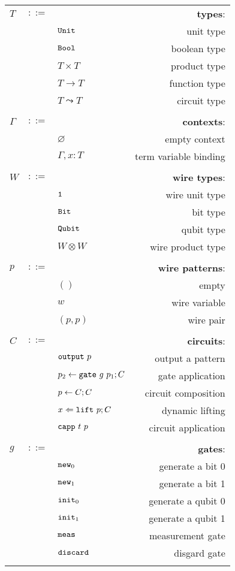 \documentclass[12pt]{article}
\begin{document}
\begin{longtable}[c]{lclr}
  $T$ &$::=$ &  &\textbf{types}: \\
      & &$\mathtt{Unit}$ &unit type\\
      & &$\mathtt{Bool}$ &boolean type \\
      & &$T\times T$ &product type\\
      & &$T\to T$ &function type\\
      & &$T\leadsto T$ &circuit type\\
  \\

  $\Gamma$ &$::=$ &  &\textbf{contexts}: \\
      & &$\varnothing$ &empty context\\
      & &$\Gamma,x:T$ &term variable binding\\
  \\


  $W$ &$::=$ &  &\textbf{wire types}: \\
      & &$\mathtt{1}$ &wire unit type\\
      & &$\mathtt{Bit}$ &bit type \\
      & &$\mathtt{Qubit}$ &qubit type \\
      & &$W \otimes W$ &wire product type \\
  \\

  $p$ &$::=$ &  &\textbf{wire patterns}: \\
      & &$()$ &empty\\
      & &$w$ &wire variable \\
      & &$(p,p)$ &wire pair \\
  \\

  $C$ &$::=$ &  &\textbf{circuits}: \\
      & &$\toutput\ p$ &output a pattern \\
      & &$p_2 \leftarrow \mathtt{gate}\ g\ p_1 ; C$ &gate application \\
      & &$p \leftarrow C ; C$ &circuit composition \\
      & &$x \From \lift\ p ; C$ &dynamic lifting \\
      & &$\capp\ t\ p$ &circuit application \\
  \\

  $g$ &$::=$ &  &\textbf{gates}: \\
      & &$\mathtt{new}_0$ &generate a bit 0 \\
      & &$\mathtt{new}_1$ &generate a bit 1 \\
      & &$\mathtt{init}_0$ &generate a qubit 0 \\
      & &$\mathtt{init}_1$ &generate a qubit 1 \\
      & &$\mathtt{meas}$ &measurement gate \\
      & &$\mathtt{discard}$ &disgard gate \\
  \\


\end{longtable}
\end{document}
